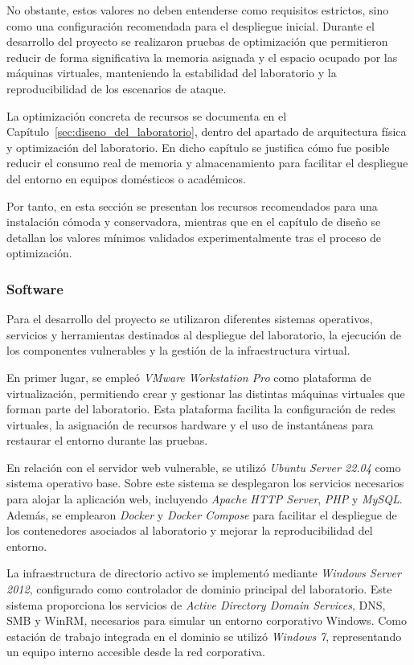 No obstante, estos valores no deben entenderse como requisitos estrictos, sino como una configuración recomendada para el despliegue inicial. Durante el desarrollo del proyecto se realizaron pruebas de optimización que permitieron reducir de forma significativa la memoria asignada y el espacio ocupado por las máquinas virtuales, manteniendo la estabilidad del laboratorio y la reproducibilidad de los escenarios de ataque.

La optimización concreta de recursos se documenta en el Capítulo~\ref{sec:diseno_del_laboratorio}, dentro del apartado de arquitectura física y optimización del laboratorio. En dicho capítulo se justifica cómo fue posible reducir el consumo real de memoria y almacenamiento para facilitar el despliegue del entorno en equipos domésticos o académicos.

Por tanto, en esta sección se presentan los recursos recomendados para una instalación cómoda y conservadora, mientras que en el capítulo de diseño se detallan los valores mínimos validados experimentalmente tras el proceso de optimización.

\subsubsection{Software}

Para el desarrollo del proyecto se utilizaron diferentes sistemas operativos, servicios y herramientas destinados al despliegue del laboratorio, la ejecución de los componentes vulnerables y la gestión de la infraestructura virtual.

En primer lugar, se empleó \textit{VMware Workstation Pro} como plataforma de virtualización, permitiendo crear y gestionar las distintas máquinas virtuales que forman parte del laboratorio. Esta plataforma facilita la configuración de redes virtuales, la asignación de recursos hardware y el uso de instantáneas para restaurar el entorno durante las pruebas.

En relación con el servidor web vulnerable, se utilizó \textit{Ubuntu Server 22.04} como sistema operativo base. Sobre este sistema se desplegaron los servicios necesarios para alojar la aplicación web, incluyendo \textit{Apache HTTP Server}, \textit{PHP} y \textit{MySQL}. Además, se emplearon \textit{Docker} y \textit{Docker Compose} para facilitar el despliegue de los contenedores asociados al laboratorio y mejorar la reproducibilidad del entorno.

La infraestructura de directorio activo se implementó mediante \textit{Windows Server 2012}, configurado como controlador de dominio principal del laboratorio. Este sistema proporciona los servicios de \textit{Active Directory Domain Services}, DNS, SMB y WinRM, necesarios para simular un entorno corporativo Windows. Como estación de trabajo integrada en el dominio se utilizó \textit{Windows 7}, representando un equipo interno accesible desde la red corporativa.

